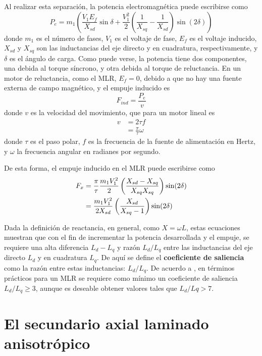 Al realizar esta separación, la potencia electromagnética puede escribirse como
\begin{equation}
P_e = m_1\left( \frac{V_1 E_f}{X_{sd}}\sin\delta
+ \frac{V_1^2}{2}\left( \frac{1}{X_{sq}} - \frac{1}{X_{sd}}\right)\sin(2\delta) \right)
\label{potenciaem}
\end{equation}
donde $m_1$ es el número de fases, $V_1$ es el voltaje de fase, $E_f$ es el voltaje inducido, $X_{sd}$ y $X_{sq}$ son las inductancias del eje directo y en cuadratura, respectivamente, y $\delta$ es el ángulo de carga. Como puede verse, la potencia tiene dos componentes, una debida al torque síncrono, y otra debida al torque de reluctancia. En un motor de reluctancia, como el MLR, $E_f = 0$, debido a que no hay una fuente externa de campo magnético, y el empuje inducido es
\begin{equation}
F_{ind} = \frac{P_e}{v}
\end{equation}
donde $v$ es la velocidad del movimiento, que para un motor lineal es
\begin{align*}
v &= 2\tau f \\
&= \frac{\pi}{\tau}\omega
\end{align*}
donde $\tau$ es el paso polar, $f$ es la frecuencia de la fuente de alimentación en Hertz, y $\omega$ la frecuencia angular en radianes por segundo.

De esta forma, el empuje inducido en el MLR puede escribirse como
\begin{align}
F_x &= \frac{\pi}{\tau}\frac{m_1 V_1^2}{2}
\left( \frac{X_{sd}-X_{sq}}{X_{sq}X_{sq}} \right)\sin(2\delta) \notag\\
&= \frac{m_1 V_1^2}{2X_{sd}}\left(\frac{X_{sd}}{X_{sq}-1}\right)\sin(2\delta)
\end{align}

Dada la definición de reactancia, en general, como $X = \omega L$, estas ecuaciones muestran que con el fin de incrementar la potencia desarrollada y el empuje, se requiere una alta diferencia $L_d-L_q$ y razón $L_d/L_q$ entre las inductancias del eje directo $L_d$ y en cuadratura $L_q$. De aquí se define el \textbf{coeficiente de saliencia} como la razón entre estas inductancias: $L_d/L_q$. De acuerdo a \cite{boldea2013}, en términos prácticos para un MLR se requiere como mínimo un coeficiente de saliencia $L_d/L_q \geq 3$, aunque es deseable obtener valores tales que $L_d/Lq > 7$.

\section{El secundario axial laminado anisotrópico}

